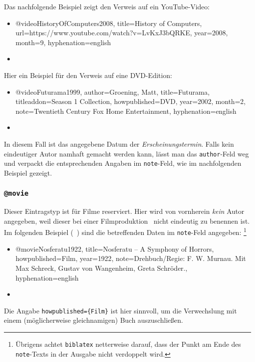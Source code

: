 Das nachfolgende Beispiel zeigt den Verweis auf ein YouTube-Video:
%
\begin{itemize}
\item[]
\begin{GenericCode}[numbers=none]
@video{HistoryOfComputers2008,
	title={History of Computers},
	url={https://www.youtube.com/watch?v=LvKxJ3bQRKE},
	year={2008},
	month={9},
	hyphenation={english}
}
\end{GenericCode}
\item[\cite{HistoryOfComputers2008}] 
\end{itemize}

\noindent
Hier ein Beispiel für den Verweis auf eine DVD-Edition:
%
\begin{itemize}
\item[] 
\begin{GenericCode}[numbers=none]
@video{Futurama1999,
  author={Groening, Matt},
  title={Futurama},
  titleaddon={Season 1 Collection},
  howpublished={DVD},
  year={2002},
  month={2},
  note={Twentieth Century Fox Home Entertainment},
  hyphenation={english}
 }
\end{GenericCode}
\item[\cite{Futurama1999}] 
\end{itemize}
%
In diesem Fall ist das angegebene Datum der \emph{Erscheinungstermin}. 
Falls kein eindeutiger Autor namhaft gemacht werden kann, lässt man das
\texttt{author}-Feld weg und verpackt die entsprechenden Angaben im \texttt{note}-Feld, wie im nachfolgenden Beispiel gezeigt.




\subsubsection{\texttt{@movie}}
\label{sec:@movie}
Dieser Eintragstyp ist für Filme reserviert. 
Hier wird von vornherein \emph{kein} Autor angegeben, weil dieser bei 
einer Filmproduktion \ia\ nicht eindeutig zu benennen ist. 
Im folgenden Beispiel (\sa\ \cite{Psycho1960}) sind die betreffenden Daten 
im \texttt{note}-Feld angegeben:%
\footnote{Übrigens achtet \texttt{biblatex} netterweise darauf, dass der  
Punkt am Ende des \texttt{note}-Texts in der Ausgabe nicht verdoppelt wird.}
%
\begin{itemize}
\item[] 
\begin{GenericCode}[numbers=none]
@movie{Nosferatu1922,
  title={Nosferatu -- A Symphony of Horrors},
  howpublished={Film},
  year={1922},
  note={Drehbuch/Regie: F. W. Murnau. Mit Max Schreck, Gustav von Wangenheim, Greta Schröder.},
  hyphenation={english}
}
\end{GenericCode}
\item[\cite{Nosferatu1922}] 
\end{itemize}
%
Die Angabe \verb!howpublished={Film}! ist hier sinnvoll, um die Verwechslung
mit einem (möglicherweise gleichnamigen) Buch auszuschließen.



